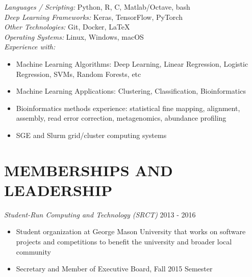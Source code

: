 \documentclass[margin, 10pt]{res} %
\begin{document}
\begin{resume}
{\sl Languages / Scripting:} 
Python, R, C, Matlab/Octave, bash\\
{\sl Deep Learning Frameworks:} Keras, TensorFlow, PyTorch \\
{\sl Other Technologies:} Git, Docker, LaTeX \\
{\sl Operating Systems:} Linux, Windows, macOS \\
{\sl Experience with:} 
\begin{itemize} \itemsep -2pt %
\item Machine Learning Algorithms: Deep Learning, Linear Regression, Logistic Regression, SVMs, Random Forests, etc
\item Machine Learning Applications: Clustering, Classification, Bioinformatics
\item Bioinformatics methods experience: statistical fine mapping, alignment, assembly, read error correction, metagenomics, abundance profiling
\item SGE and Slurm grid/cluster computing systems
\end{itemize}


\section{MEMBERSHIPS AND LEADERSHIP}
{\sl Student-Run Computing and Technology (SRCT)} \hfill 2013 - 2016 \begin{itemize} \itemsep -2pt %
\item Student organization at George Mason University that works on software projects and competitions to benefit the university and broader local community
\item Secretary and Member of Executive Board, Fall 2015 Semester
\end{itemize}


\end{resume}
\end{document}
